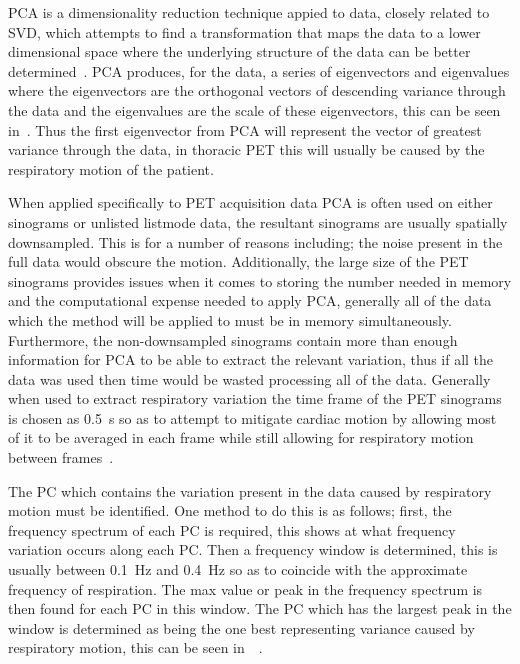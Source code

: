                 \gls{PCA} is a dimensionality reduction technique appied to data, closely related to \gls{SVD}, which attempts to find a transformation that maps the data to a lower dimensional space where the underlying structure of the data can be better determined~. \gls{PCA} produces, for the data, a series of eigenvectors and eigenvalues where the eigenvectors are the orthogonal vectors of descending variance through the data and the eigenvalues are the scale of these eigenvectors, this can be seen in~. Thus the first eigenvector from \gls{PCA} will represent the vector of greatest variance through the data, in thoracic \gls{PET} this will usually be caused by the respiratory motion of the patient.
                
                When applied specifically to \gls{PET} acquisition data \gls{PCA} is often used on either sinograms or unlisted listmode data, the resultant sinograms are usually spatially downsampled. This is for a number of reasons including; the noise present in the full data would obscure the motion. Additionally, the large size of the \gls{PET} sinograms provides issues when it comes to storing the number needed in memory and the computational expense needed to apply \gls{PCA}, generally all of the data which the method will be applied to must be in memory simultaneously. Furthermore, the non-downsampled sinograms contain more than enough information for \gls{PCA} to be able to extract the relevant variation, thus if all the data was used then time would be wasted processing all of the data. Generally when used to extract respiratory variation the time frame of the \gls{PET} sinograms is chosen as \SI{0.5}{\second} so as to attempt to mitigate cardiac motion by allowing most of it to be averaged in each frame while still allowing for respiratory motion between frames~.
                
                The \gls{PC} which contains the variation present in the data caused by respiratory motion must be identified. One method to do this is as follows; first, the frequency spectrum of each \gls{PC} is required, this shows at what frequency variation occurs along each \gls{PC}. Then a frequency window is determined, this is usually between \SI{0.1}{\hertz} and \SI{0.4}{\hertz} so as to coincide with the approximate frequency of respiration. The max value or peak in the frequency spectrum is then found for each \gls{PC} in this window. The \gls{PC} which has the largest peak in the window is determined as being the one best representing variance caused by respiratory motion, this can be seen in~~.
                

